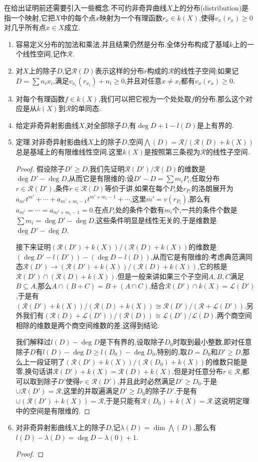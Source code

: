 在给出证明前还需要引入一些概念.不可约非奇异曲线$X$上的分布(distribution)是指一个映射,它把$X$中的每个点$x$映射为一个有理函数$r_x\in k(X)$,使得$v_x(r_x)\ge0$对几乎所有点$x\in X$成立.
\begin{enumerate}
	\item 容易定义分布的加法和乘法,并且结果仍然是分布.全体分布构成了基域$k$上的一个线性空间,记作$\mathscr{R}$.
	\item 对$X$上的除子$D$,记$\mathscr{R}(D)$表示这样的分布$r$构成的$\mathscr{R}$的线性子空间:如果记$D=\sum n_ix_i$,满足$v_{x_i}(r_{x_i})+n_i\ge0$,并且对任意$x\not=x_i$都有$v_x(r_x)\ge0$.
	\item 对每个有理函数$f\in k(X)$,我们可以把它视为一个处处取$f$的分布.那么这个对应是从$k(X)$到$\mathscr{R}$的单同态.
	\item 给定非奇异射影曲线$X$,对全部除子$D$,有$\deg D+1-l(D)$是上有界的.
	\item 定理.对非奇异射影曲线$X$上的除子$D$,空间$\bigwedge(D)=\mathscr{R}/(\mathscr{R}(D)+k(X))$总是基域上的有限维线性空间.这里$k(X)$是按照第三条视为$\mathscr{R}$的线性子空间.
	\begin{proof}
		
		假设除子$D'\ge D$,我们先证明$\mathscr{R}(D')/\mathscr{R}(D)$的维数是$\deg D'-\deg D$,从而它是有限维的:设$D'-D=\sum m_iP_i$,任取分布$r\in\mathscr{R}(D')$,条件$r\in\mathscr{R}(D)$等价于讲,如果在每个$P_i$处$r_{P_i}$的洛朗展开为$a_{m'}t^{m'}+\cdots+a_{m'+m_i-1}t^{m'+m_i-1}+\cdots$,这里$m'=v(r_{P_i})$,那么有$a_{m'}=\cdots=a_{m'+m_i-1}=0$.在点$P_i$处的条件个数有$m_i$个,一共的条件个数是$\sum m_i=\deg D'-\deg D$,这些条件明显是线性无关的,于是维数是$\deg D'-\deg D$.
		
		接下来证明$(\mathscr{R}(D')+k(X))/(\mathscr{R}(D)+k(X))$的维数是$(\deg D'-l(D'))-(\deg D-l(D))$,从而它是有限维的:考虑典范满同态$\mathscr{R}(D')\to(\mathscr{R}(D')+k(X))/(\mathscr{R}(D)+k(X))$,它的核是$\mathscr{R}(D')\cap(\mathscr{R}(D)+k(X))$.但是一般来讲如果三个子空间$A,B,C$满足$B\subseteq A$,那么$A\cap(B+C)=B+(A\cap C)$,结合$\mathscr{R}(D')\cap k(X)=\mathscr{L}(D')$,于是有$(\mathscr{R}(D')+k(X))/(\mathscr{R}(D)+k(X))\cong\mathscr{R}(D')/(\mathscr{R}+\mathscr{L}(D'))$.另外我们有$(\mathscr{R}(D)+\mathscr{L}(D'))/(\mathscr{R}(D))\cong\mathscr{L}(D')/\mathscr{L}(D)$.两个商空间相除的维数是两个商空间维数的差,这得到结论.
		
		我们解释过$l(D)-\deg D$是下有界的,设取除子$D_0$时取到最小整数,即对任意除子$D$有$l(D)-\deg D\ge l(D_0)-\deg D_0$,特别的,取$D=D_0$和$D'\ge D$,那么上一段证明了$(\mathscr{R}(D')+k(X))/(\mathscr{R}(D_0)+k(X))$的维数只能是零,换句话讲$\mathscr{R}(D')+k(X)=\mathscr{R}(D)+k(X)$.但是对任意分布$r\in\mathscr{R}$,都可以取到除子$D'$使得$r\in\mathscr{R}(D')$,并且此时必然满足$D'\ge D_0$.于是$\cup\mathscr{R}(D')=\mathscr{R}$,这里的并取遍满足$D'\ge D_0$的除子$D'$.于是有$\cup(\mathscr{R}(D')+k(X))=\mathscr{R}$,于是只能有$\mathscr{R}(D_0)+k(X)=\mathscr{R}$.这说明定理中的空间是有限维的.
	\end{proof}
    \item 对非奇异射影曲线$X$上的除子$D$,记$\lambda(D)=\dim\bigwedge(D)$,那么有$l(D)-\lambda(D)=\deg D-\lambda(0)+1$.
    \begin{proof}
    	

\end{proof}
\end{enumerate}

